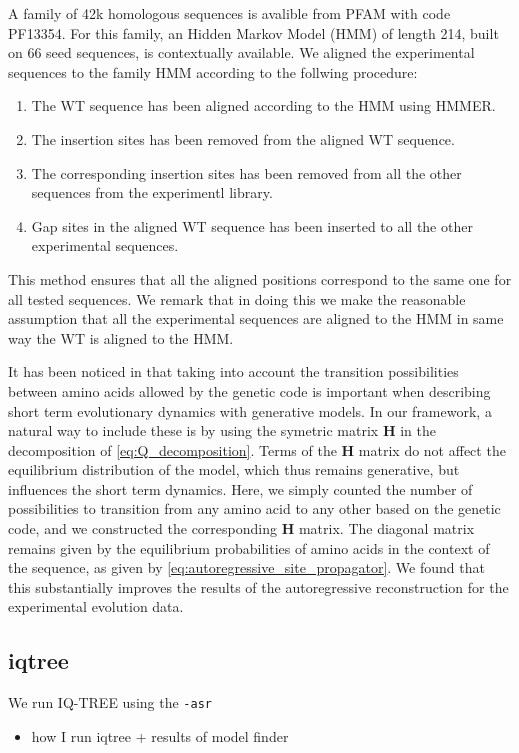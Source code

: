 A family of 42k homologous sequences is avalible from PFAM with code PF13354.
For this family, an Hidden Markov Model (HMM) of length 214, built on 66 seed sequences, is contextually available.
We aligned the experimental sequences to the family HMM according to the follwing procedure:
\begin{enumerate}
	\item The WT sequence has been aligned according to the HMM using HMMER.
	\item The insertion sites has been removed from the aligned WT sequence.
	\item The corresponding insertion sites has been removed from all the other sequences from the experimentl library.
	\item Gap sites in the aligned WT sequence has been inserted to all the other experimental sequences.
\end{enumerate}
This method ensures that all the aligned positions correspond to the same one for all tested sequences. We remark that in doing this we make the reasonable assumption that all the experimental sequences are aligned to the HMM in same way the WT is aligned to the HMM.

It has been noticed in \cite{bisardi_modelingsequencespaceexploration_2021} that taking into account the transition possibilities between amino acids allowed by the genetic code is important when describing short term evolutionary dynamics with generative models. 
In our framework, a natural way to include these is by using the symetric matrix $\mathbf{H}$ in the decomposition of \eqref{eq:Q_decomposition}. 
Terms of the $\mathbf{H}$ matrix do not affect the equilibrium distribution of the model, which thus remains generative, but influences the short term dynamics. 
Here, we simply counted the number of possibilities to transition from any amino acid to any other based on the genetic code, and we constructed the corresponding $\mathbf{H}$ matrix. 
The diagonal matrix remains given by the equilibrium probabilities of amino acids in the context of the sequence, as given by \eqref{eq:autoregressive_site_propagator}.
We found that this substantially improves the results of the autoregressive reconstruction for the experimental evolution data.

\subsection{iqtree}


We run IQ-TREE using the \texttt{-asr}

\begin{itemize}
	\item how I run iqtree + results of model finder
\end{itemize}

